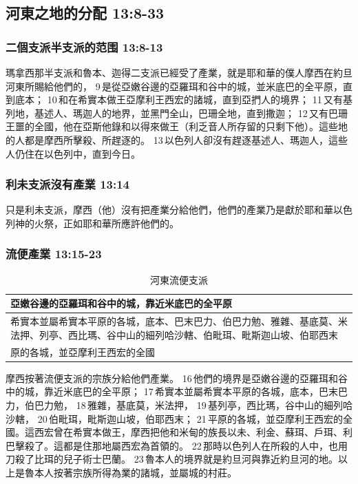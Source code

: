 \subsection{河東之地的分配 13:8-33 }
\subsubsection{二個支派半支派的范围 13:8-13 }
瑪拿西那半支派和魯本、迦得二支派已經受了產業，就是耶和華的僕人摩西在約旦河東所賜給他們的， 9 是從亞嫩谷邊的亞羅珥和谷中的城，並米底巴的全平原，直到底本； 10 和在希實本做王亞摩利王西宏的諸城，直到亞捫人的境界； 11 又有基列地，基述人、瑪迦人的地界，並黑門全山，巴珊全地，直到撒迦； 12 又有巴珊王噩的全國，他在亞斯他錄和以得來做王（利乏音人所存留的只剩下他）。這些地的人都是摩西所擊殺、所趕逐的。 13 以色列人卻沒有趕逐基述人、瑪迦人，這些人仍住在以色列中，直到今日。

\subsubsection{利未支派沒有產業 13:14}
只是利未支派，摩西（他）沒有把產業分給他們，他們的產業乃是獻於耶和華以色列神的火祭，正如耶和華所應許他們的。

\subsubsection{流便產業 13:15-23}
\begin{table}[!hbp]
\centering
\begin{tabular}{|p{15cm}|}
\hline
\hline
 亞嫩谷邊的亞羅珥和谷中的城，靠近米底巴的全平原  \\\hline
 希實本並屬希實本平原的各城，底本、巴末巴力、伯巴力勉、雅雜、基底莫、米法押、列亭、西比瑪、谷中山的細列哈沙轄、伯毗珥、毗斯迦山坡、伯耶西末\\\hline
 原的各城，並亞摩利王西宏的全國\\\hline
 \end{tabular}
\caption{河東流便支派}
\end{table}
摩西按著流便支派的宗族分給他們產業。 16 他們的境界是亞嫩谷邊的亞羅珥和谷中的城，靠近米底巴的全平原； 17 希實本並屬希實本平原的各城，底本，巴末巴力，伯巴力勉， 18 雅雜，基底莫，米法押， 19 基列亭，西比瑪，谷中山的細列哈沙轄， 20 伯毗珥，毗斯迦山坡，伯耶西末； 21 平原的各城，並亞摩利王西宏的全國。這西宏曾在希實本做王，摩西把他和米甸的族長以未、利金、蘇珥、戶珥、利巴擊殺了。這都是住那地屬西宏為首領的。 22 那時以色列人在所殺的人中，也用刀殺了比珥的兒子術士巴蘭。 23 魯本人的境界就是約旦河與靠近約旦河的地。以上是魯本人按著宗族所得為業的諸城，並屬城的村莊。


